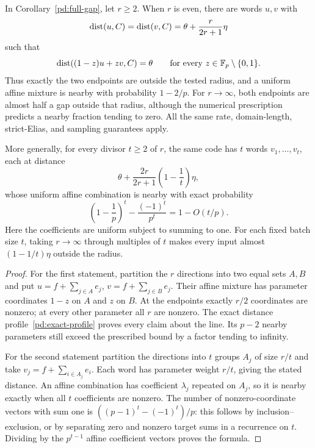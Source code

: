 \begin{corollary}
\label{pd:two-far-inputs}
In Corollary~\ref{pd:full-gap}, let $r\ge2$. When $r$ is even,
there are words $u,v$ with
\[
 \operatorname{dist}(u,C)=\operatorname{dist}(v,C)=\theta+\frac{r}{2r+1}\eta
\]
such that
\[
 \operatorname{dist}((1-z)u+zv,C)=\theta
 \qquad\text{for every }z\in\mathbb F_p\setminus\{0,1\}.
\]
Thus exactly the two endpoints are outside the tested radius, and a
uniform affine mixture is nearby with probability $1-2/p$.
For $r\to\infty$, both endpoints are almost half a gap outside that
radius, although the numerical prescription predicts a nearby fraction
tending to zero. All the same rate, domain-length, strict-Elias, and
sampling guarantees apply.

More generally, for every divisor $t\ge2$ of $r$, the same code has
$t$ words $v_1,\ldots,v_t$, each at distance
\[
 \theta+\frac{2r}{2r+1}\left(1-\frac1t\right)\eta,
\]
whose uniform affine combination is nearby with exact probability
\[
 \left(1-\frac1p\right)^t-\frac{(-1)^t}{p^t}
 =1-O(t/p).
\]
Here the coefficients are uniform subject to summing to one.
For each fixed batch size $t$, taking $r\to\infty$ through multiples
of $t$ makes every input almost $(1-1/t)\eta$ outside the radius.
\end{corollary}
\begin{proof}
For the first statement, partition the $r$ directions into two equal
sets $A,B$ and put
$u=f+\sum_{j\in A}e_j$, $v=f+\sum_{j\in B}e_j$.
Their affine mixture has parameter coordinates $1-z$ on $A$ and
$z$ on $B$. At the endpoints exactly $r/2$ coordinates are nonzero;
at every other parameter all $r$ are nonzero.
The exact distance profile~\eqref{pd:exact-profile} proves every claim
about the line. Its $p-2$ nearby parameters still exceed the prescribed
bound by a factor tending to infinity.

For the second statement partition the directions into $t$ groups
$A_j$ of size $r/t$ and take $v_j=f+\sum_{i\in A_j}e_i$.
Each word has parameter weight $r/t$, giving the stated distance.
An affine combination has coefficient $\lambda_j$ repeated on $A_j$,
so it is nearby exactly when all $t$ coefficients are nonzero.
The number of nonzero-coordinate vectors with sum one is
$((p-1)^t-(-1)^t)/p$: this follows by inclusion--exclusion, or by
separating zero and nonzero target sums in a recurrence on $t$.
Dividing by the $p^{t-1}$ affine coefficient vectors proves the formula.
\end{proof}

